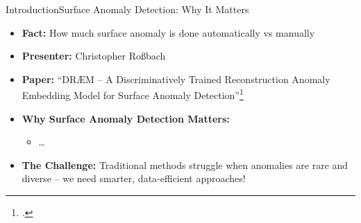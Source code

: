 \begin{frame}{Introduction}{Surface Anomaly Detection: Why It Matters}
    \begin{itemize}
        \item \textbf{Fact:} How much surface anomaly is done automatically vs manually
        \pause
        
        \item \textbf{Presenter:} Christopher Roßbach
        
        \item \textbf{Paper:} ``DRÆM -- A Discriminatively Trained Reconstruction Anomaly Embedding Model for Surface Anomaly Detection''\footcite{zavrtanikDRAEMDiscriminativelyTrained2021}
        \pause
        
        \item \textbf{Why Surface Anomaly Detection Matters:}
        \begin{itemize}
            \item \ldots
        \end{itemize}
        \pause
        
        \item \textbf{The Challenge:} Traditional methods struggle when anomalies are rare and diverse -- we need smarter, data-efficient approaches!
    \end{itemize}
\end{frame}